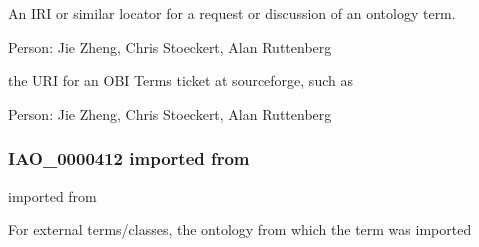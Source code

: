\documentclass[letterpaper,10pt,english]{sphinxmanual}
\begin{document}
\begin{sphinxShadowBox}

\sphinxAtStartPar
An IRI or similar locator for a request or discussion of an ontology term.
\end{sphinxShadowBox}

\begin{sphinxShadowBox}

\sphinxAtStartPar
Person: Jie Zheng, Chris Stoeckert, Alan Ruttenberg
\end{sphinxShadowBox}

\begin{sphinxShadowBox}

\sphinxAtStartPar
the URI for an OBI Terms ticket at sourceforge, such as 
\end{sphinxShadowBox}

\begin{sphinxShadowBox}

\sphinxAtStartPar
Person: Jie Zheng, Chris Stoeckert, Alan Ruttenberg
\end{sphinxShadowBox}
\begin{quote}

\ignorespaces \end{quote}


\subsubsection{IAO\_0000412 \sphinxhyphen{} imported from}
\label{\detokenize{doc-IAO_0000412:iao-0000412-imported-from}}\label{\detokenize{doc-IAO_0000412:index-0}}\label{\detokenize{doc-IAO_0000412::doc}}
\begin{sphinxShadowBox}

\sphinxAtStartPar
imported from
\end{sphinxShadowBox}

\begin{sphinxShadowBox}

\sphinxAtStartPar
For external terms/classes, the ontology from which the term was imported
\end{sphinxShadowBox}
\end{document}
